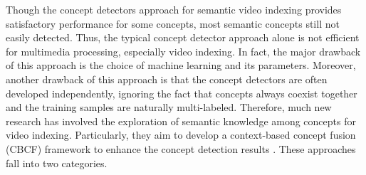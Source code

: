 	Though the concept detectors approach for semantic video indexing provides satisfactory performance 	
	for some concepts, most semantic concepts still not easily detected. Thus, the typical concept detector 
	approach alone is not efficient for multimedia processing, especially video indexing. In fact, the major 
	drawback of this approach is the choice of machine learning and its parameters. Moreover, another 
	drawback of this approach is that the concept detectors are often developed independently, ignoring 
	the fact that concepts always coexist together and the training samples are naturally multi-labeled. 
	Therefore, much new research has involved 		the exploration of semantic knowledge among concepts 
	for video indexing. Particularly, they aim to develop a context-based concept fusion (CBCF) framework
	to enhance the concept detection results \citep{Jiang2009,Smith2003}. These approaches fall into two categories.
	
